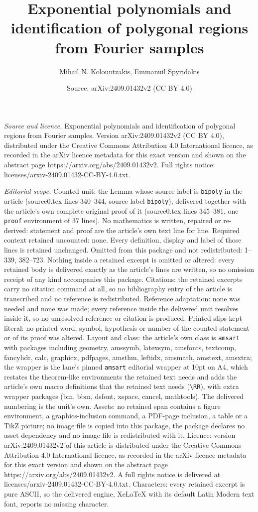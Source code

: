 \documentclass[10pt,a4paper]{amsart}
\title[Exponential polynomials and identification of polygonal regi]{Exponential polynomials and identification of polygonal regions from Fourier samples}
\author{Mihail N. Kolountzakis, Emmanuil Spyridakis}
\date{Source: arXiv:2409.01432v2 (CC BY 4.0)}
\begin{document}
\maketitle

\noindent\emph{Source and licence.} Exponential polynomials and identification of polygonal regions from Fourier samples. Version arXiv:2409.01432v2 (CC BY 4.0), distributed under the Creative Commons Attribution 4.0 International licence, as recorded in the arXiv licence metadata for this exact version and shown on the abstract page https://arxiv.org/abs/2409.01432v2. Full rights notice: licenses/arxiv-2409.01432-CC-BY-4.0.txt.\par\smallskip

\noindent\textit{Editorial scope.} Counted unit: the Lemma whose source label is \texttt{bipoly} in the article (source0.tex lines 340--344, source label \texttt{bipoly}), delivered together with the article's own complete original proof of it (source0.tex lines 345--381, one \texttt{proof} environment of 37 lines). No mathematics is written, repaired or re-derived: statement and proof are the article's own text line for line. Required context retained uncounted: none. Every definition, display and label of those lines is retained unchanged. Omitted from this package and not redistributed: 1--339, 382--723. Nothing inside a retained excerpt is omitted or altered: every retained body is delivered exactly as the article's lines are written, so no omission receipt of any kind accompanies this package. Citations: the retained excerpts carry no citation command at all, so no bibliography entry of the article is transcribed and no reference is redistributed. Reference adaptation: none was needed and none was made; every reference inside the delivered unit resolves inside it, so no unresolved reference or citation is produced. Printed slips kept literal: no printed word, symbol, hypothesis or number of the counted statement or of its proof was altered. Layout and class: the article's own class is \texttt{amsart} with packages including geometry, amssymb, latexsym, amsfonts, textcomp, fancyhdr, calc, graphicx, pdfpages, amsthm, leftidx, amsmath, amstext, amsxtra; the wrapper is the lane's pinned \texttt{amsart} editorial wrapper at 10pt on A4, which restates the theorem-like environments the retained text needs and adds the article's own macro definitions that the retained text needs (\texttt{\textbackslash RR}), with extra wrapper packages (bm, bbm, dsfont, xspace, cancel, mathtools). The delivered numbering is the unit's own. Assets: no retained span contains a figure environment, a graphics-inclusion command, a PDF-page inclusion, a table or a TikZ picture; no image file is copied into this package, the package declares no asset dependency and no image file is redistributed with it. Licence: version arXiv:2409.01432v2 of this article is distributed under the Creative Commons Attribution 4.0 International licence, as recorded in the arXiv licence metadata for this exact version and shown on the abstract page https://arxiv.org/abs/2409.01432v2. A full rights notice is delivered at licenses/arxiv-2409.01432-CC-BY-4.0.txt. Characters: every retained excerpt is pure ASCII, so the delivered engine, XeLaTeX with its default Latin Modern text font, reports no missing character.
\end{document}
